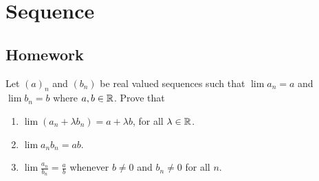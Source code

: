 




\chapter{Sequence}
\section{Homework}

\begin{exercise}
  Let $(a)_n$ and $(b_n)$ be real valued sequences such that
  $\lim a_n=a$ and $\lim b_n=b$ where $a,b\in\R$. Prove that
  \begin{enumerate}
    \item $\lim(a_n+\lambda b_n)=a+\lambda b$, for all $\lambda\in\R$.
    \item $\lim a_nb_n=ab$.
    \item $\lim\frac{a_n}{b_n}=\frac{a}{b}$ whenever $b\neq 0$ and 
      $b_n\neq 0$ for all $n$.
  \end{enumerate}
\end{exercise}

